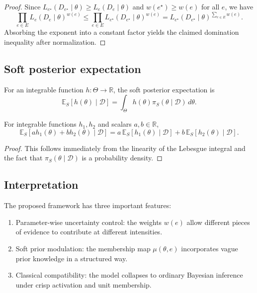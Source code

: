 \documentclass[twoside]{article}
\begin{document}
\begin{proof}
Since $L_{e^\star}(D_{e^\star}\mid \theta)\geq L_e(D_e\mid \theta)$ and $w(e^\star)\geq w(e)$ for all $e$, we have
\[
\prod_{e\in E}L_e(D_e\mid \theta)^{w(e)}
\leq
\prod_{e\in E}L_{e^\star}(D_{e^\star}\mid \theta)^{w(e)}
=
L_{e^\star}(D_{e^\star}\mid \theta)^{\sum_{e\in E}w(e)}.
\]
Absorbing the exponent into a constant factor yields the claimed domination inequality after normalization.
\end{proof}

\subsection{Soft posterior expectation}

\begin{dfn}
For an integrable function $h:\Theta\to\mathbb{R}$, the soft posterior expectation is
\[
\mathbb{E}_S[h(\theta)\mid \mathcal{D}]
=
\int_\Theta h(\theta)\pi_S(\theta\mid \mathcal{D})\,d\theta.
\]
\end{dfn}

\begin{pro}[Linearity]
For integrable functions $h_1,h_2$ and scalars $a,b\in\mathbb{R}$,
\[
\mathbb{E}_S[ah_1(\theta)+bh_2(\theta)\mid \mathcal{D}]
=
a\,\mathbb{E}_S[h_1(\theta)\mid \mathcal{D}]
+
b\,\mathbb{E}_S[h_2(\theta)\mid \mathcal{D}].
\]
\end{pro}

\begin{proof}
This follows immediately from the linearity of the Lebesgue integral and the fact that $\pi_S(\theta\mid \mathcal{D})$ is a probability density.
\end{proof}

\subsection{Interpretation}

The proposed framework has three important features:

\begin{enumerate}
    \item Parameter-wise uncertainty control: the weights $w(e)$ allow different pieces of evidence to contribute at different intensities.
    \item Soft prior modulation: the membership map $\mu(\theta,e)$ incorporates vague prior knowledge in a structured way.
    \item Classical compatibility: the model collapses to ordinary Bayesian inference under crisp activation and unit membership.
\end{enumerate}
\end{document}
